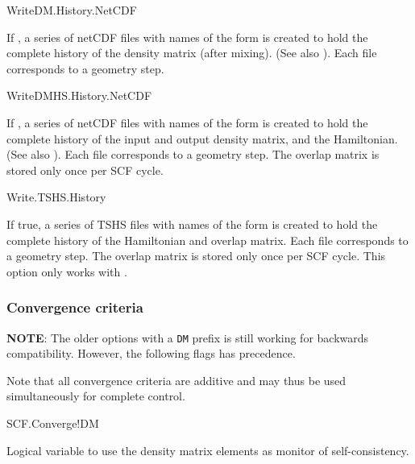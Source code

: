 \begin{fdflogicalF}{WriteDM.History.NetCDF}

  If \fdftrue, a series of netCDF files with names of the form
   is created to hold the complete history of the
  density matrix (after mixing). (See also ). Each
  file corresponds to a geometry step.

\end{fdflogicalF}

\begin{fdflogicalF}{WriteDMHS.History.NetCDF}

  If \fdftrue, a series of netCDF files with names of the form
   is created to hold the complete history of the
  input and output density matrix, and the Hamiltonian.  (See also
  ). Each file corresponds to a geometry
  step. The overlap matrix is stored only once per SCF cycle.

\end{fdflogicalF}

\begin{fdflogicalF}{Write.TSHS.History}

  If true, a series of TSHS files with names of the form
   is created to hold the complete history of the
  Hamiltonian and overlap matrix. Each file corresponds to a geometry
  step. The overlap matrix is stored only once per SCF cycle. This
  option only works with \tsiesta.

\end{fdflogicalF}


\subsubsection{Convergence criteria}

\textbf{NOTE}: The older options with a \texttt{DM} prefix is still
working for backwards compatibility. However, the following flags has
precedence.

Note that all convergence criteria are additive and may thus be used
simultaneously for complete control.

\begin{fdflogicalT}{SCF.Converge!DM}

  Logical variable to use the density matrix elements as monitor
  of self-consistency.
  
\end{fdflogicalT}

